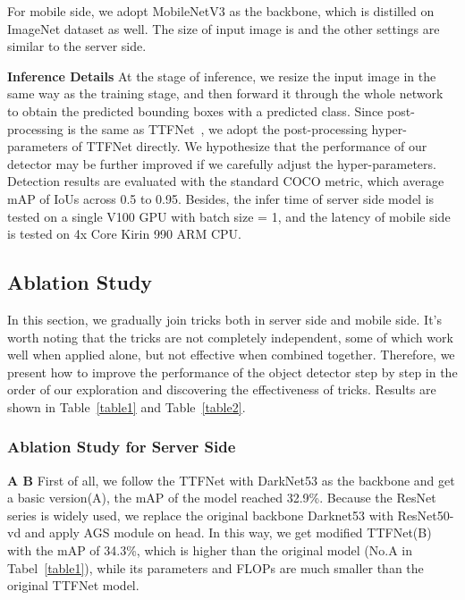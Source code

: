 \documentclass[10pt,twocolumn,letterpaper]{article}
\begin{document}
    For mobile side, we adopt MobileNetV3 as the backbone, which is distilled on ImageNet dataset as well. The size of input image is  and the other settings are similar to the server side.
    
{\bf Inference Details} 
    At the stage of inference, we resize the input image in the same way as the training stage, and then forward it through the whole network to obtain the predicted bounding boxes with a predicted class. Since post-processing is the same as TTFNet~\cite{liu2020training}, we adopt the post-processing hyper-parameters of TTFNet directly. We hypothesize that the performance of our detector may be further improved if we carefully adjust the hyper-parameters. Detection results are evaluated with the standard COCO metric, which average mAP of IoUs across 0.5 to 0.95. Besides, the infer time of server side model is tested on a single V100 GPU with batch size = 1, and the latency of mobile side is tested on 4x Core Kirin 990 ARM CPU. 
    
    
    \subsection{Ablation Study}
In this section,  we gradually join tricks both in server side and mobile side. It's worth noting that the tricks are not completely independent, some of which work well when applied alone, but not effective when combined together. Therefore, we present how to improve the performance of the object detector step by step in the order of our exploration and discovering the effectiveness of tricks. Results are shown in Table~\ref{table1} and Table~\ref{table2}.
    











    
    \subsubsection{Ablation Study for Server Side}
{\bf{A  B}} First of all, we follow the TTFNet with DarkNet53 as the backbone and get a basic version(A), the mAP of the model reached 32.9\%. Because the ResNet series is  widely used, we replace the original backbone Darknet53 with ResNet50-vd and apply AGS module on head. In this way, we get modified TTFNet(B) with the mAP of 34.3\%, which is higher than the original model (No.A in Tabel~\ref{table1}), while its parameters and FLOPs are much smaller than the original TTFNet model.
    
\end{document}

